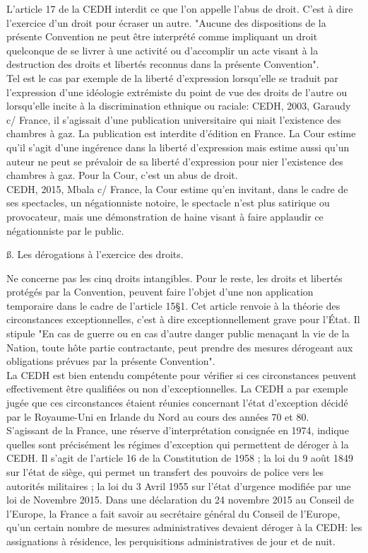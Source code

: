 \documentclass[10pt, a4paper, openany]{book}
\begin{document}
L'article 17 de la CEDH interdit ce que l'on appelle l'abus de droit. C'est à dire l'exercice d'un droit pour écraser un autre. "Aucune des dispositions de la présente Convention ne peut être interprété comme impliquant un droit quelconque de se livrer à une activité ou d'accomplir un acte visant à la destruction des droits et libertés reconnus dans la présente Convention". \\
Tel est le cas par exemple de la liberté d'expression lorsqu'elle se traduit par l'expression d'une idéologie extrémiste du point de vue des droits de l'autre ou lorsqu'elle incite à la discrimination ethnique ou raciale: CEDH, 2003, Garaudy c/ France, il s'agissait d'une publication universitaire qui niait l'existence des chambres à gaz. La publication est interdite d'édition en France. La Cour estime qu'il s'agit d'une ingérence dans la liberté d'expression mais estime aussi qu'un auteur ne peut se prévaloir de sa liberté d'expression pour nier l'existence des chambres à gaz. Pour la Cour, c'est un abus de droit. \\
CEDH, 2015, Mbala c/ France, la Cour estime qu'en invitant, dans le cadre de ses spectacles, un négationniste notoire, le spectacle n'est plus satirique ou provocateur, mais une démonstration de haine visant à faire applaudir ce négationniste par le public. 


ß. Les dérogations à l'exercice des droits.


Ne concerne pas les cinq droits intangibles. Pour le reste, les droits et libertés protégés par la Convention, peuvent faire l'objet d'une non application temporaire dans le cadre de l'article 15§1. Cet article renvoie à la théorie des circonstances exceptionnelles, c'est à dire exceptionnellement grave pour l'État. Il stipule "En cas de guerre ou en cas d'autre danger public menaçant la vie de la Nation, toute hôte partie contractante, peut prendre des mesures dérogeant aux obligations prévues par la présente Convention". \\
La CEDH est bien entendu compétente pour vérifier si ces circonstances peuvent effectivement être qualifiées ou non d'exceptionnelles. La CEDH a par exemple jugée que ces circonstances étaient réunies concernant l'état d'exception décidé par le Royaume-Uni en Irlande du Nord au cours des années 70 et 80. \\
S'agissant de la France, une réserve d'interprétation consignée en 1974, indique quelles sont précisément les régimes d'exception qui permettent de déroger à la CEDH. Il s'agit de l'article 16 de la Constitution de 1958 ; la loi du 9 août 1849 sur l'état de siège, qui permet un transfert des pouvoirs de police vers les autorités militaires ; la loi du 3 Avril 1955 sur l'état d'urgence modifiée par une loi de Novembre 2015. Dans une déclaration du 24 novembre 2015 au Conseil de l'Europe, la France a fait savoir au secrétaire général du Conseil de l'Europe, qu'un certain nombre de mesures administratives devaient déroger à la CEDH: les assignations à résidence, les perquisitions administratives de jour et de nuit. 
\end{document}
